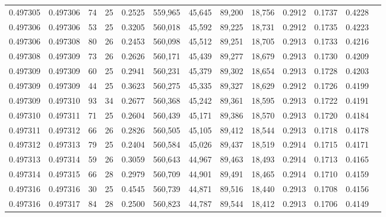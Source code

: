 \begin{tabular}{rrrrrrrrrrrrr}
0.497305 & 0.497306 &  74 &  25 &                                     0.2525 & 559,965 &  45,645 &  89,200 &  18,756 & 0.2912 & 0.1737 & 0.4228 \\
0.497306 & 0.497306 &  53 &  25 &                                     0.3205 & 560,018 &  45,592 &  89,225 &  18,731 & 0.2912 & 0.1735 & 0.4223 \\
0.497306 & 0.497308 &  80 &  26 &                                     0.2453 & 560,098 &  45,512 &  89,251 &  18,705 & 0.2913 & 0.1733 & 0.4216 \\
0.497308 & 0.497309 &  73 &  26 &                                     0.2626 & 560,171 &  45,439 &  89,277 &  18,679 & 0.2913 & 0.1730 & 0.4209 \\
0.497309 & 0.497309 &  60 &  25 &                                     0.2941 & 560,231 &  45,379 &  89,302 &  18,654 & 0.2913 & 0.1728 & 0.4203 \\
0.497309 & 0.497309 &  44 &  25 &                                     0.3623 & 560,275 &  45,335 &  89,327 &  18,629 & 0.2912 & 0.1726 & 0.4199 \\
0.497309 & 0.497310 &  93 &  34 &                                     0.2677 & 560,368 &  45,242 &  89,361 &  18,595 & 0.2913 & 0.1722 & 0.4191 \\
0.497310 & 0.497311 &  71 &  25 &                                     0.2604 & 560,439 &  45,171 &  89,386 &  18,570 & 0.2913 & 0.1720 & 0.4184 \\
0.497311 & 0.497312 &  66 &  26 &                                     0.2826 & 560,505 &  45,105 &  89,412 &  18,544 & 0.2913 & 0.1718 & 0.4178 \\
0.497312 & 0.497313 &  79 &  25 &                                     0.2404 & 560,584 &  45,026 &  89,437 &  18,519 & 0.2914 & 0.1715 & 0.4171 \\
0.497313 & 0.497314 &  59 &  26 &                                     0.3059 & 560,643 &  44,967 &  89,463 &  18,493 & 0.2914 & 0.1713 & 0.4165 \\
0.497314 & 0.497315 &  66 &  28 &                                     0.2979 & 560,709 &  44,901 &  89,491 &  18,465 & 0.2914 & 0.1710 & 0.4159 \\
0.497316 & 0.497316 &  30 &  25 &                                     0.4545 & 560,739 &  44,871 &  89,516 &  18,440 & 0.2913 & 0.1708 & 0.4156 \\
0.497316 & 0.497317 &  84 &  28 &                                     0.2500 & 560,823 &  44,787 &  89,544 &  18,412 & 0.2913 & 0.1706 & 0.4149 \\

\end{tabular}
